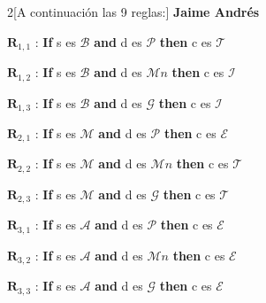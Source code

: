 \documentclass[10pt,onecolumn,twoside,letterpaper]{article}
\begin{document}
\begin{multicols}{2}[A continuaci\'on las 9 reglas:]
\textbf{Jaime Andr\'es}\\
{\small
\par$\mathbf{R}_{1,1}$ : \textbf{If} s es $\mathcal{B}$ \textbf{and} d es $\mathcal{P}$ \textbf{then} c es $\mathcal{T}$\\
\par$\mathbf{R}_{1,2}$ : \textbf{If} s es $\mathcal{B}$ \textbf{and} d es $\mathcal{M}n$ \textbf{then} c es $\mathcal{I}$\\
\par$\mathbf{R}_{1,3}$ : \textbf{If} s es $\mathcal{B}$ \textbf{and} d es $\mathcal{G}$ \textbf{then} c es $\mathcal{I}$\\
\par$\mathbf{R}_{2,1}$ : \textbf{If} s es $\mathcal{M}$ \textbf{and} d es $\mathcal{P}$ \textbf{then} c es $\mathcal{E}$\\
\par$\mathbf{R}_{2,2}$ : \textbf{If} s es $\mathcal{M}$ \textbf{and} d es $\mathcal{M}n$ \textbf{then} c es $\mathcal{T}$\\
\par$\mathbf{R}_{2,3}$ : \textbf{If} s es $\mathcal{M}$ \textbf{and} d es $\mathcal{G}$ \textbf{then} c es $\mathcal{T}$\\
\par$\mathbf{R}_{3,1}$ : \textbf{If} s es $\mathcal{A}$ \textbf{and} d es $\mathcal{P}$ \textbf{then} c es $\mathcal{E}$\\
\par$\mathbf{R}_{3,2}$ : \textbf{If} s es $\mathcal{A}$ \textbf{and} d es $\mathcal{M}n$ \textbf{then} c es $\mathcal{E}$\\
\par$\mathbf{R}_{3,3}$ : \textbf{If} s es $\mathcal{A}$ \textbf{and} d es $\mathcal{G}$ \textbf{then} c es $\mathcal{E}$}\\
\end{multicols}
\end{document}

